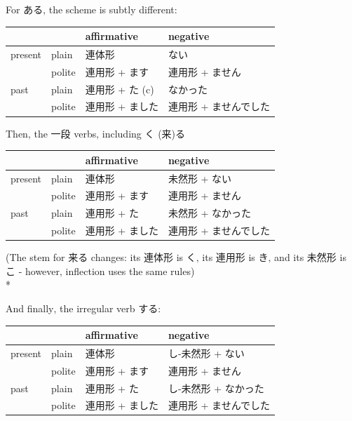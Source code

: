 \documentclass[11pt, b5paper, twoside, openright, onecolumn]{book}
\makeatletter
\newcommand*{\rubystack}[2]{{\relscale{0.5}%
  \begin{tabular}[b]{@{}c@{}}%
    {#1}\\%
   {\textscale{2}{#2}}%
  \end{tabular}}%
}
\DeclareRobustCommand*{\ruby}[2]{%
  \mbox{%
    \setlength{\parskip}{0ex}%
    \BeginAccSupp{method=pdfstringdef,ActualText={#1}}%
      \rubystack{\phantom{#2}}{#1}%
      \llap{%
        \rubystack{#2}{\phantom{#1}}%
      }%
    \EndAccSupp{}%
  }%
}
\renewcommand*{\ruby}[2]{#2 (#1)}%
\newenvironment{exampleblock}{
\setlength{\parindent}{0.6in}
\begin{minipage}[t]{\dimexpr\textwidth-\parindent}}
{\end{minipage}}
\newenvironment{mytabular}[1]{\noindent\hspace{0.4in}
\begin{tabular}[h]{#1}}{\end{tabular}}
\makeatother
\begin{document}
For ある‚ the scheme is subtly different:

\vspace{0.5cm}
\smaller
\begin{mytabular}{| l  l  l  l |}\hline 
\rule{0pt}{2.4ex} &  & affirmative & negative\\ 
\hline
\rule{0pt}{2.4ex}present & plain & 連体形 & ない\\ 
\rule{0pt}{2.4ex} & polite & 連用形 + ます & 連用形 + ません\\ 
\rule{0pt}{2.4ex}past & plain & 連用形 + た (c) & なかった\\ 
\rule{0pt}{2.4ex} & polite & 連用形 + ました & 連用形 + ませんでした\\ 
\hline 
\end{mytabular}
\larger
\vspace{0.5cm}


Then‚ the 一段 verbs‚ including \ruby{来}{く}る

\vspace{0.5cm}
\smaller
\begin{mytabular}{| l  l  l  l |}\hline 
\rule{0pt}{2.4ex} &  & affirmative & negative\\ 
\hline
\rule{0pt}{2.4ex}present & plain & 連体形 & 未然形 + ない\\ 
\rule{0pt}{2.4ex} & polite & 連用形 + ます & 連用形 + ません\\ 
\rule{0pt}{2.4ex}past & plain & 連用形 + た & 未然形 + なかった\\ 
\rule{0pt}{2.4ex} & polite & 連用形 + ました & 連用形 + ませんでした\\ 
\hline 
\end{mytabular}
\larger
\vspace{0.5cm}

\begin{exampleblock}
(The stem for 来る changes: its 連体形 is く‚ its 連用形 is き‚ and its 未然形 is こ - however‚ inflection uses the same rules) \\* 
\end{exampleblock}
\vspace{0.2cm}

And finally‚ the irregular verb する:

\vspace{0.5cm}
\smaller
\begin{mytabular}{| l  l  l  l |}\hline 
\rule{0pt}{2.4ex} &  & affirmative & negative\\ 
\hline
\rule{0pt}{2.4ex}present & plain & 連体形 & し-未然形 + ない\\ 
\rule{0pt}{2.4ex} & polite & 連用形 + ます & 連用形 + ません\\ 
\rule{0pt}{2.4ex}past & plain & 連用形 + た & し-未然形 + なかった\\ 
\rule{0pt}{2.4ex} & polite & 連用形 + ました & 連用形 + ませんでした\\ 
\hline 
\end{mytabular}
\larger
\vspace{0.5cm}
\end{document}
